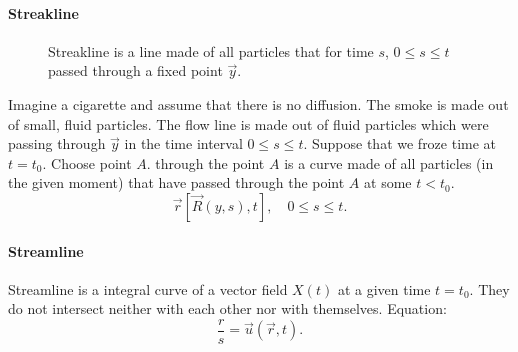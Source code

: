   
  
  \paragraph{Streakline}

  \begin{figure}
    \centering
    \caption{Streakline is a line made of all particles that for time $s$, $0 \leq s \leq t$ 
    passed through a fixed point $\vec y$.}
    \label{fig:1.11}
  \end{figure}

  

  Imagine a cigarette and assume that there is no diffusion. 
  The smoke is made out of small, fluid particles.
  The flow line is made out of fluid particles which were passing through $\vec y$ in the time interval
  $0 \leq s \leq t$.
  Suppose that we froze time at $t = t_0$.
  Choose point $A$.
   through the point $A$ is a curve made of all particles (in the given moment) that have passed
  through the point $A$ at some $t < t_0$.
  \begin{displaymath}
    \vec r [ \vec R(y,s), t], \quad 0 \leq s \leq t.
  \end{displaymath}

  \paragraph{Streamline}
  Streamline is a integral curve of a vector field $X(t)$ at a given time $t = t_0$.
  They do not intersect neither with each other nor with themselves.
  Equation:
  \begin{displaymath}
    \dfrac{r}{s} = \vec u(\vec r, t).
  \end{displaymath}

